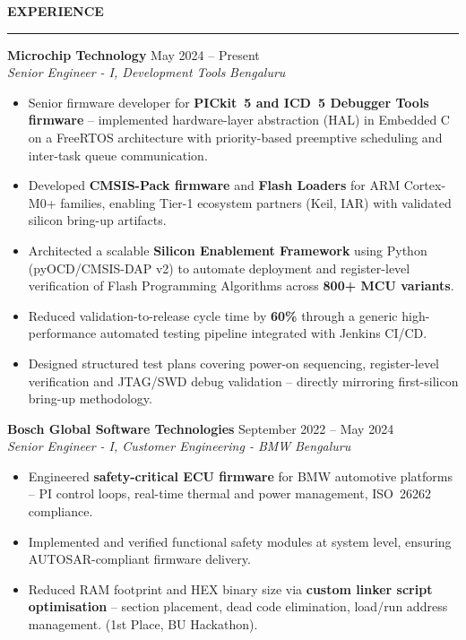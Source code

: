 \documentclass[11pt,a4paper]{article}
\newcommand{\resumesection}[1]{
    \vspace{1.2em} 
    {\large \textbf{\uppercase{#1}}}
    \vspace{0.2em}
    \hrule
    \vspace{0.6em} 
}
\newcommand{\jobrole}[4]{
    \noindent
    \textbf{#1} \hfill #3 \\ 
    \textit{#4} \hfill \textit{#2}
    \vspace{0.3em} 
}
\newenvironment{achievements}{
    \begin{itemize}[leftmargin=1.5em, itemsep=4pt, topsep=2pt, parsep=0pt]
}{
    \end{itemize}
    \vspace{0.6em} 
}
\begin{document}
\resumesection{Experience}

\jobrole{Microchip Technology}{Bengaluru}{May 2024 -- Present}{Senior Engineer - I, Development Tools}
\begin{achievements}
    \item Senior firmware developer for \textbf{PICkit~5 and ICD~5 Debugger Tools firmware} -- implemented hardware-layer abstraction (HAL) in Embedded C on a FreeRTOS architecture with priority-based preemptive scheduling and inter-task queue communication.
    \item Developed \textbf{CMSIS-Pack firmware} and \textbf{Flash Loaders} for ARM Cortex-M0+ families, enabling Tier-1 ecosystem partners (Keil, IAR) with validated silicon bring-up artifacts.
    \item Architected a scalable \textbf{Silicon Enablement Framework} using Python (pyOCD/CMSIS-DAP v2) to automate deployment and register-level verification of Flash Programming Algorithms across \textbf{800+ MCU variants}.
    \item Reduced validation-to-release cycle time by \textbf{60\%} through a generic high-performance automated testing pipeline integrated with Jenkins CI/CD.
    \item Designed structured test plans covering power-on sequencing, register-level verification and JTAG/SWD debug validation -- directly mirroring first-silicon bring-up methodology.
\end{achievements}

\jobrole{Bosch Global Software Technologies}{Bengaluru}{September 2022 -- May 2024}{Senior Engineer - I, Customer Engineering - BMW} 
\begin{achievements}
    \item Engineered \textbf{safety-critical ECU firmware} for BMW automotive platforms -- PI control loops, real-time thermal and power management, ISO~26262 compliance.
    \item Implemented and verified functional safety modules at system level, ensuring AUTOSAR-compliant firmware delivery.
    \item Reduced RAM footprint and HEX binary size via \textbf{custom linker script optimisation} -- section placement, dead code elimination, load/run address management. (1st Place, BU Hackathon).
\end{achievements}
\end{document}

